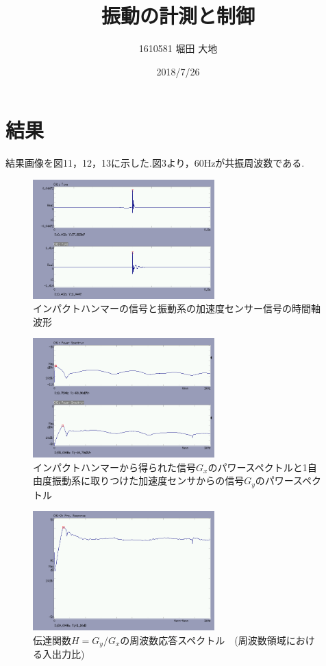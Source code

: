 \documentclass[twocolumn, 10pt,a4j]{jsarticle}
\title{\vspace{-2.5cm}振動の計測と制御}
\author{1610581 堀田 大地}
\date{2018/7/26}
\begin{document}
  \maketitle{}
  \section{結果}
    結果画像を図11，12，13に示した.図3より，60Hzが共振周波数である.

    \begin{figure}[H]
      \begin{center}
        \includegraphics[width=7cm]{../img/experiments/011.png}
        \caption{インパクトハンマーの信号と振動系の加速度センサー信号の時間軸波形}
      \end{center}
    \end{figure}
    \begin{figure}[H]
      \begin{center}
        \includegraphics[width=7cm]{../img/experiments/013.png}
        \caption{インパクトハンマーから得られた信号$G_{x}$のパワースペクトルと1自由度振動系に取りつけた加速度センサからの信号$G_{y}$のパワースペクトル}
      \end{center}
    \end{figure}
    \begin{figure}[H]
      \begin{center}
        \includegraphics[width=7cm]{../img/experiments/015.png}
        \caption{伝達関数$H = G_{y}/G_{x}$の周波数応答スペクトル　(周波数領域における入出力比)}
      \end{center}
    \end{figure}
  
\end{document}

